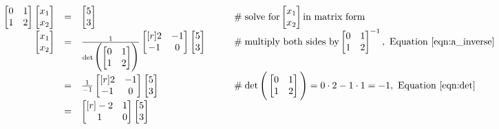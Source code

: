 \documentclass[11pt, oneside]{article}   	%
\begin{document}
\begin{equation*}
\begin{array}{rcll}
\begin{bmatrix} 0 & 1 \\ 1 & 2  \end{bmatrix}   \begin{bmatrix} x_1 \\  x_2 \end{bmatrix}  
&=& \begin{bmatrix}  5 \\ 3\end{bmatrix}
     & \qquad \mathrel{\#}  \text{solve for} \begin{bmatrix} x_1 \\ x_2 \end{bmatrix} \text{in matrix form} \\
\begin{bmatrix} x_1 \\ x_2 \end{bmatrix}
&=& \frac{1} {\det \Bigg (\begin{bmatrix} 0 & 1 \\ 1 & 2  \end{bmatrix} \Bigg )} \begin{bmatrix}[r] 2 & -1 \\ -1 & 0 \end{bmatrix} \begin{bmatrix} 5 \\ 3 \end{bmatrix} 
     & \qquad \mathrel{\#}  \text{multiply both sides by} \begin{bmatrix} 0 & 1 \\ 1 & 2  \end{bmatrix}^{-1}, \text{ Equation } \ref{eqn:a_inverse}  \\
&=& \frac{1}{-1} \begin{bmatrix}[r] 2 & -1 \\ -1 & 0 \end{bmatrix} \begin{bmatrix} 5 \\ 3 \end{bmatrix} 
     & \qquad \mathrel{\#}  \det \Bigg (\begin{bmatrix} 0 & 1 \\ 1 & 2  \end{bmatrix} \Bigg ) =  0 \cdot 2 -1 \cdot 1 = -1, \text{ Equation } \ref{eqn:det} \\
&=& \begin{bmatrix}[r] -2 & 1 \\ 1 & 0 \end{bmatrix} \begin{bmatrix} 5 \\ 3 \end{bmatrix} 

\end{array}
\end{equation*}
\end{document}
